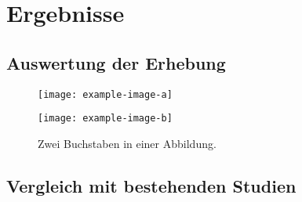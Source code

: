 \chapter{Ergebnisse}

\section{Auswertung der Erhebung}

\lipsum[1-3]

\begin{figure}[t]
  \begin{minipage}{\linewidth}
    \begin{minipage}{0.5\linewidth}
      \centering
      \texttt{[image: example-image-a]}
    \end{minipage}%
    \begin{minipage}{0.5\linewidth}
      \centering
      \texttt{[image: example-image-b]}
    \end{minipage}
    \caption{Zwei Buchstaben in einer Abbildung.}
  \end{minipage}
\end{figure}

\section{Vergleich mit bestehenden Studien}

\lipsum[4-8]

